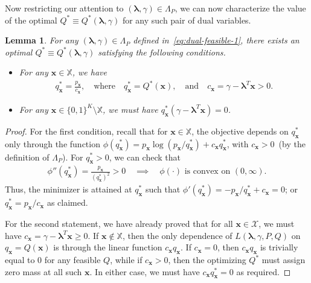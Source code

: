 \documentclass{article}
\theoremstyle{plain}
\newtheorem{lemma}[lemma]{Lemma}
\theoremstyle{definition}
\newcommand{\calX}{\mathcal X}
\newcommand{\xvec}{\mathbf{x}}
\newcommand{\qtext}[1]{\quad \text{#1} \quad}
\newcommand{\boldlambda}{\boldsymbol{\lambda}}
\newcommand{\finitesupport}{\mathbb{X}}
\begin{document}
Now restricting our attention to $(\boldlambda, \gamma) \in \Lambda_P$, we can now characterize the value of the optimal $Q^* \equiv Q^*(\boldlambda, \gamma)$ for any such pair of dual variables. 
\begin{lemma}
    \label{lemma:finite-optimal-Q} For any $(\boldlambda, \gamma) \in \Lambda_P$ defined in~\eqref{eq:dual-feasible-1}, there exists an optimal $Q^* \equiv Q^*(\boldlambda, \gamma)$ satisfying the following conditions. 
    \begin{itemize}
        \item For any $\xvec \in \finitesupport$, we have 
        \begin{align}
            q^*_\xvec = \frac{p_\xvec}{c_\xvec}, \qtext{where} q^*_\xvec = Q^*(\xvec), \qtext{and} c_\xvec = \gamma - \boldlambda^T \xvec > 0. 
        \end{align}
        \item For any $\xvec \in \{0,1\}^K \setminus \finitesupport$, we must have $q^*_\xvec (\gamma - \boldlambda^T \xvec) = 0$. 
    \end{itemize}
\end{lemma}

\begin{proof}
For the first condition, recall that for $\xvec \in \finitesupport$, the objective depends on $q^*_\xvec$ only through the function $\phi(q^*_\xvec) = p_\xvec \log(p_\xvec/q^*_\xvec) + c_\xvec q^*_\xvec$, with $c_\xvec > 0$~(by the definition of   $\Lambda_P$). For $q^*_\xvec > 0$, we can check that 
\begin{align}
    \phi''(q^*_\xvec) =  \frac{p_\xvec}{(q^*_\xvec)^2} > 0  \quad \implies \quad 
    \phi(\cdot) \text{ is convex on } (0, \infty). 
\end{align}
Thus, the minimizer is attained at $q^*_\xvec$ such that $\phi'(q^*_\xvec) = -p_\xvec/q^*_\xvec +  c_\xvec = 0$; or $q^*_\xvec = p_\xvec/c_\xvec$ as claimed. 

For the second statement, we have already proved that for all $\xvec \in \calX$, we must have $c_\xvec = \gamma -  \boldlambda^T \xvec \geq 0$.  If $\xvec \not \in \finitesupport$, then the only dependence of $L(\boldlambda, \gamma, P, Q)$ on $q_\xvec = Q(\xvec)$ is through the linear function $c_\xvec q_\xvec$. If $c_\xvec = 0$, then $c_\xvec q_\xvec$ is trivially equal to $0$ for any feasible $Q$, while if $c_\xvec>0$, then the optimizing $Q^*$ must assign zero mass at all such $\xvec$. In either case, we must have $c_\xvec q^*_\xvec = 0$ as required. 
\end{proof}
\end{document}
